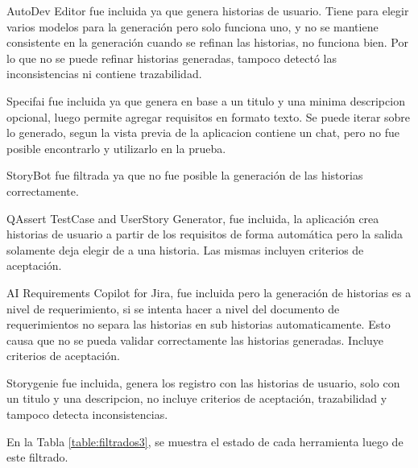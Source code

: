 AutoDev Editor fue incluida ya que genera historias de usuario. Tiene para elegir varios modelos para la generación pero solo funciona uno, y no se mantiene consistente en la generación cuando se refinan las historias, no funciona bien. Por lo que no se puede refinar historias generadas, tampoco detectó las inconsistencias ni contiene trazabilidad.

Specifai fue incluida ya que genera en base a un titulo y una minima descripcion opcional, luego permite agregar requisitos en formato texto. Se puede iterar sobre lo generado, segun la vista previa de la aplicacion contiene un chat, pero no fue posible encontrarlo y utilizarlo en la prueba.

StoryBot fue filtrada ya que no fue posible la generación de las historias correctamente. %

QAssert TestCase and UserStory Generator, fue incluida, la aplicación crea historias de usuario a partir de los requisitos de forma automática pero la salida solamente deja elegir de a una historia. Las mismas incluyen criterios de aceptación.

AI Requirements Copilot for Jira, fue incluida pero la generación de historias es a nivel de requerimiento, si se intenta hacer a nivel del documento de requerimientos no separa las historias en sub historias automaticamente. Esto causa que no se pueda validar correctamente las historias generadas. Incluye criterios de aceptación.

Storygenie fue incluida, genera los registro con las historias de usuario, solo con un titulo y una descripcion, no incluye criterios de aceptación, trazabilidad y tampoco detecta inconsistencias.

En la Tabla \ref{table:filtrados3}, se muestra el estado de cada herramienta luego de este filtrado.

